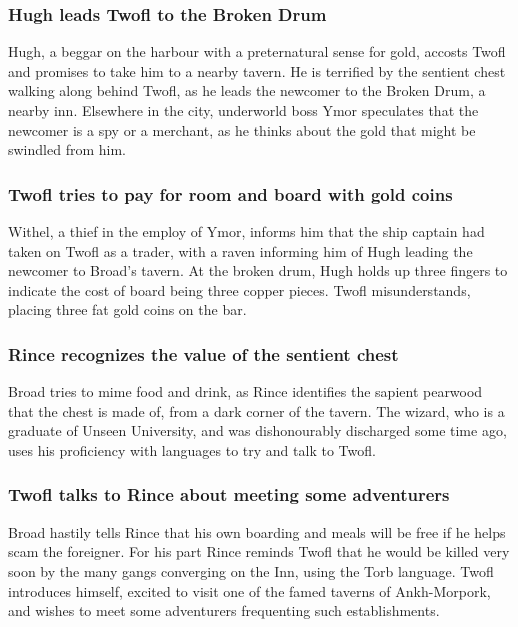 \subsubsection{\Gls{Hugh} leads \Gls{Twofl} to the Broken Drum}
\Gls{Hugh}, a beggar on the harbour with a preternatural sense for gold, accosts \Gls{Twofl} and
promises to take him to a nearby tavern. He is terrified by the sentient chest walking along behind
\Gls{Twofl}, as he leads the newcomer to the Broken Drum, a nearby inn. Elsewhere in the city,
underworld boss \Gls{Ymor} speculates that the newcomer is a spy or a merchant, as he thinks about
the gold that might be swindled from him.

\subsubsection{\Gls{Twofl} tries to pay for room and board with gold coins}
\Gls{Withel}, a thief in the employ of \Gls{Ymor}, informs him that the ship captain had taken on
\Gls{Twofl} as a trader, with a raven informing him of \Gls{Hugh} leading the newcomer to
\Gls{Broad}'s tavern. At the broken drum, \Gls{Hugh} holds up three fingers to indicate the cost
of board being three copper pieces. \Gls{Twofl} misunderstands, placing three fat gold coins on the
bar.

\subsubsection{\Gls{Rince} recognizes the value of the sentient chest}
\Gls{Broad} tries to mime food and drink, as \Gls{Rince} identifies the sapient pearwood that the
chest is made of, from a dark corner of the tavern. The wizard, who is a graduate of Unseen
University, and was dishonourably discharged some time ago, uses his proficiency with languages to
try and talk to \Gls{Twofl}.

\subsubsection{\Gls{Twofl} talks to \Gls{Rince} about meeting some adventurers}
\Gls{Broad} hastily tells \Gls{Rince} that his own boarding and meals will be free if he helps
scam the foreigner. For his part \Gls{Rince} reminds \Gls{Twofl} that he would be killed very soon
by the many gangs converging on the Inn, using the Torb language. \Gls{Twofl} introduces himself,
excited to visit one of the famed taverns of Ankh-Morpork, and wishes to meet some adventurers
frequenting such establishments.

